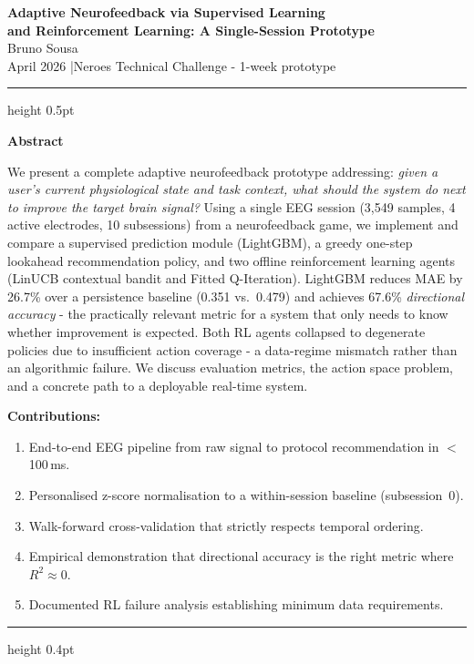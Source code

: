 \documentclass[11pt,a4paper]{article}
\begin{document}
\begin{center}
  {\LARGE\bfseries Adaptive Neurofeedback via Supervised Learning\\[4pt]
   and Reinforcement Learning: A Single-Session Prototype}\\[10pt]
  {\large Bruno Sousa}\\[3pt]
  {\normalsize April 2026 \quad|\quad Neroes Technical Challenge - 1-week prototype}
\end{center}
\vspace{4pt}\hrule height 0.5pt\vspace{8pt}

\begin{center}{\large\bfseries Abstract}\end{center}
\noindent
We present a complete adaptive neurofeedback prototype addressing: \emph{given a
user's current physiological state and task context, what should the system do
next to improve the target brain signal?} Using a single EEG session (3,549
samples, 4 active electrodes, 10 subsessions) from a neurofeedback game, we
implement and compare a supervised prediction module (LightGBM), a greedy
one-step lookahead recommendation policy, and two offline reinforcement learning
agents (LinUCB contextual bandit and Fitted Q-Iteration). LightGBM reduces MAE
by 26.7\% over a persistence baseline (0.351 vs.\ 0.479) and achieves 67.6\%
\emph{directional accuracy} - the practically relevant metric for a system that
only needs to know whether improvement is expected. Both RL agents collapsed to
degenerate policies due to insufficient action coverage - a data-regime mismatch
rather than an algorithmic failure. We discuss evaluation metrics, the action
space problem, and a concrete path to a deployable real-time system.

\textbf{Contributions:}
\begin{enumerate}
  \item End-to-end EEG pipeline from raw signal to protocol recommendation in $<$100\,ms.
  \item Personalised z-score normalisation to a within-session baseline (subsession~0).
  \item Walk-forward cross-validation that strictly respects temporal ordering.
  \item Empirical demonstration that directional accuracy is the right metric where $R^2\approx 0$.
  \item Documented RL failure analysis establishing minimum data requirements.
\end{enumerate}
\vspace{2pt}\hrule height 0.4pt\vspace{6pt}
\end{document}
